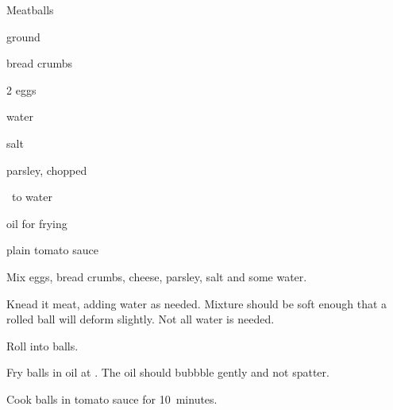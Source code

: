 \begin{recipe}{Meatballs}{}{}

\begin{ingredients}
\item {} ground 
\item {} bread crumbs
\item 2 eggs
\item {} 
\item {} water
\item {} salt
\item parsley, chopped 
\item \quarter\ to \C{\half} water
\item oil for frying
\item plain tomato sauce
\end{ingredients}

\begin{directions}
\item Mix eggs, bread crumbs, cheese, parsley, salt and some water.
\item Knead it meat, adding water as needed. Mixture should be soft enough that a rolled ball will deform slightly. Not all water is needed.
\item Roll into balls.
\item Fry balls in oil at . The oil should bubbble gently and not spatter.
\item Cook balls in tomato sauce for 10~minutes.
\end{directions}

\end{recipe}
